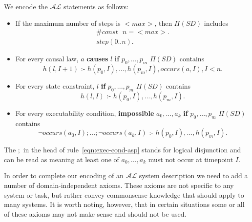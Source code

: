 \documentclass[../interim.tex]{subfiles}
\begin{document}
\noindent
We encode the $\mathcal{AL}$ statements as follows:
\begin{itemize}
  \item If the maximum number of steps is $<max>$, then $\Pi(SD)$ includes \begin{gather}
    \#const \text{ } n = \text{} <max>. \\
    step(0..n).
  \end{gather}

  \item For every causal law, $a$ \textbf{causes} $l$ \textbf{if} $p_0,...,p_m$ $\Pi(SD)$ contains
  \begin{equation}
    h(l, I+1) \text{ :- } h(p_0, I),..., h(p_m, I), occurs(a, I), I < n.
  \end{equation}

  \item For every state constraint, $l$ \textbf{if} $p_0,...,p_m$ $\Pi(SD)$ contains
  \begin{equation}
    h(l, I) \text{ :- } h(p_0, I), ..., h(p_m, I).
  \end{equation}

  \item For every executability condition, \textbf{impossible} $a_0,...,a_k$ \textbf{if} $p_0,...,p_m$ $\Pi(SD)$ contains
  \begin{equation}
    \neg occurs(a_0, I) ; ... ; \neg occurs(a_k, I) \text{ :- } h(p_0, I),..., h(p_m, I).
    \label{eqn:exec-cond-asp}
  \end{equation}
\end{itemize}

The $;$ in the head of rule~\ref{eqn:exec-cond-asp} stands for logical disjunction and can be read as meaning at least one of $a_0,...,a_k$ must not occur at timepoint $I$.

In order to complete our encoding of an $\mathcal{AL}$ system description we need to add a number of domain-independent axioms. These axioms are not specific to any system or task, but rather convey commonsense knowledge that should apply to many systems. It is worth noting, however, that in certain situations some or all of these axioms may not make sense and should not be used.
\end{document}
